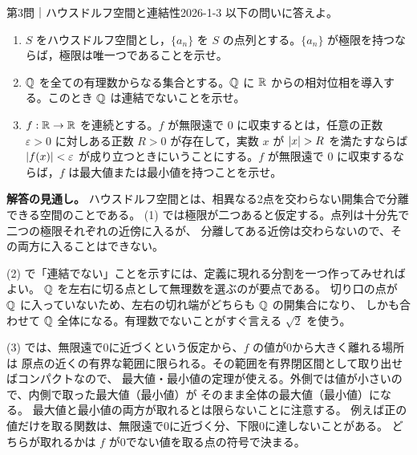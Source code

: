 \begin{problem}{第3問｜ハウスドルフ空間と連結性}{2026-1-3}
以下の問いに答えよ。
\begin{enumerate}
  \item[(1)] $S$ をハウスドルフ空間とし，$\{a_n\}$ を $S$ の点列とする。$\{a_n\}$ が極限を持つならば，極限は唯一つであることを示せ。
  \item[(2)] $\mathbb{Q}$ を全ての有理数からなる集合とする。$\mathbb{Q}$ に $\mathbb{R}$ からの相対位相を導入する。このとき $\mathbb{Q}$ は連結でないことを示せ。
  \item[(3)] $f:\mathbb{R}\to\mathbb{R}$ を連続とする。$f$ が無限遠で $0$ に収束するとは，任意の正数 $\varepsilon>0$ に対しある正数 $R>0$ が存在して，実数 $x$ が $\lvert x \rvert>R$ を満たすならば $\lvert f(x) \rvert<\varepsilon$ が成り立つときにいうことにする。$f$ が無限遠で $0$ に収束するならば，$f$ は最大値または最小値を持つことを示せ。
\end{enumerate}
\end{problem}
\begin{memo*}
\textbf{解答の見通し。}
ハウスドルフ空間とは、相異なる2点を交わらない開集合で分離できる空間のことである。
(1) では極限が二つあると仮定する。点列は十分先で二つの極限それぞれの近傍に入るが、
分離してある近傍は交わらないので、その両方に入ることはできない。

(2) で「連結でない」ことを示すには、定義に現れる分割を一つ作ってみせればよい。
$\mathbb{Q}$ を左右に切る点として無理数を選ぶのが要点である。
切り口の点が $\mathbb{Q}$ に入っていないため、左右の切れ端がどちらも $\mathbb{Q}$ の開集合になり、
しかも合わせて $\mathbb{Q}$ 全体になる。有理数でないことがすぐ言える $\sqrt2$ を使う。

(3) では、無限遠で0に近づくという仮定から、$f$ の値が0から大きく離れる場所は
原点の近くの有界な範囲に限られる。その範囲を有界閉区間として取り出せばコンパクトなので、
最大値・最小値の定理が使える。外側では値が小さいので、内側で取った最大値（最小値）が
そのまま全体の最大値（最小値）になる。
最大値と最小値の両方が取れるとは限らないことに注意する。
例えば正の値だけを取る関数は、無限遠で0に近づく分、下限0に達しないことがある。
どちらが取れるかは $f$ が0でない値を取る点の符号で決まる。
\end{memo*}
